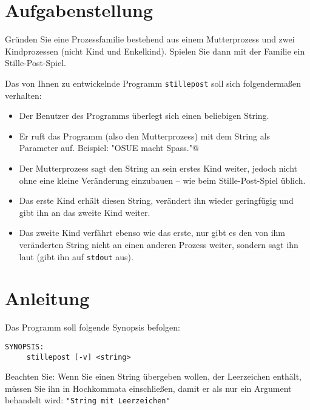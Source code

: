 




\section*{Aufgabenstellung}

Gründen Sie eine Prozessfamilie bestehend aus einem Mutterprozess und
zwei Kindprozessen (nicht Kind und Enkelkind). Spielen Sie dann mit
der Familie ein Stille-Post-Spiel.

Das von Ihnen zu entwickelnde Programm {\tt stillepost} soll sich
folgendermaßen verhalten:

\begin{itemize}
\item Der Benutzer des Programms überlegt sich einen beliebigen
String.
\item Er ruft das Programm (also den Mutterprozess) mit dem String als
Parameter auf. Beispiel:
\verb@stillepost "OSUE macht Spass."@
\item Der Mutterprozess sagt den String an sein erstes Kind weiter,
jedoch nicht ohne eine kleine Veränderung einzubauen – wie beim
Stille-Post-Spiel üblich.
\item Das erste Kind erhält diesen String, verändert ihn wieder
geringfügig und gibt ihn an das zweite Kind weiter.
\item Das zweite Kind verfährt ebenso wie das erste, nur gibt es den
von ihm veränderten String nicht an einen anderen Prozess weiter,
sondern sagt ihn laut (gibt ihn auf {\tt stdout} aus).
\end{itemize}





\section*{Anleitung}

Das Programm soll folgende Synopsis befolgen:
\begin{verbatim}
SYNOPSIS:
     stillepost [-v] <string>
\end{verbatim}

Beachten Sie: Wenn Sie einen String übergeben wollen, der Leerzeichen
enthält, müssen Sie ihn in Hochkommata einschließen, damit er als
nur ein Argument behandelt wird: \verb_"String mit Leerzeichen"_

